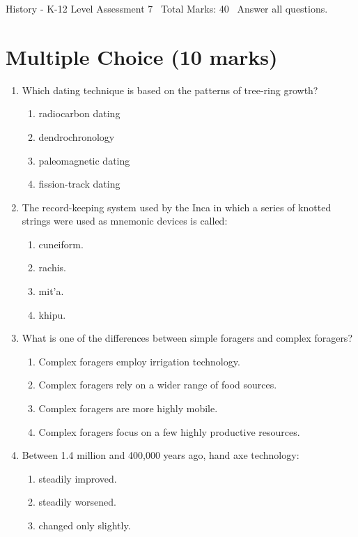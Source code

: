 \documentclass[12pt]{article}
\begin{document}
\begin{center}
History - K-12 Level Assessment 7 \
Total Marks: 40 \
Answer all questions.
\end{center}

\section*{Multiple Choice (10 marks)}
\begin{enumerate}[label=\arabic*.]
\item Which dating technique is based on the patterns of tree-ring growth?
\begin{enumerate}[label=(\alph*)]
    \item radiocarbon dating
    \item dendrochronology
    \item paleomagnetic dating
    \item fission-track dating
\end{enumerate}
\item The record-keeping system used by the Inca in which a series of knotted strings were used as mnemonic devices is called:
\begin{enumerate}[label=(\alph*)]
    \item cuneiform.
    \item rachis.
    \item mit'a.
    \item khipu.
\end{enumerate}
\item What is one of the differences between simple foragers and complex foragers?
\begin{enumerate}[label=(\alph*)]
    \item Complex foragers employ irrigation technology.
    \item Complex foragers rely on a wider range of food sources.
    \item Complex foragers are more highly mobile.
    \item Complex foragers focus on a few highly productive resources.
\end{enumerate}
\item Between 1.4 million and 400,000 years ago, hand axe technology:
\begin{enumerate}[label=(\alph*)]
    \item steadily improved.
    \item steadily worsened.
    \item changed only slightly.

\end{enumerate}
\end{enumerate}
\end{document}
